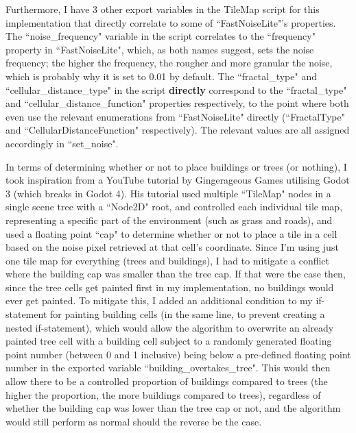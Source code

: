Furthermore, I have 3 other export variables in the TileMap script for this implementation that directly correlate to some of ``FastNoiseLite"'s properties. The ``noise\_frequency" variable in the script correlates to the ``frequency" property in ``FastNoiseLite", which, as both names suggest, sets the noise frequency; the higher the frequency, the rougher and more granular the noise\cite{fastnoiselitedocs}, which is probably why it is set to 0.01 by default.\cite{fastnoiselitedocs}  The ``fractal\_type" and ``cellular\_distance\_type" in the script \textbf{directly} correspond to the ``fractal\_type" and ``cellular\_distance\_function" properties respectively, to the point where both even use the relevant enumerations from ``FastNoiseLite" directly (``FractalType" and ``CellularDistanceFunction" respectively).\cite{fastnoiselitedocs} The relevant values are all assigned accordingly in ``set\_noise".

In terms of determining whether or not to place buildings or trees (or nothing), I took inspiration from a YouTube tutorial by Gingerageous Games utilising Godot 3\cite{gingergd3tutorialYT}\cite{gingergd3tutorialGH} (which breaks in Godot 4). His tutorial used multiple ``TileMap" nodes in a single scene tree with a ``Node2D" root, and controlled each individual tile map, representing a specific part of the environment (such as grass and roads), and used a floating point ``cap" to determine whether or not to place a tile in a cell based on the noise pixel retrieved at that cell's coordinate.\cite{gingergd3tutorialYT}\cite{gingergd3tutorialGH} Since I'm using just one tile map for everything (trees and buildings), I had to mitigate a conflict where the building cap was smaller than the tree cap. If that were the case then, since the tree cells get painted first in my implementation, no buildings would ever get painted. To mitigate this, I added an additional condition to my if-statement for painting building cells (in the same line, to prevent creating a nested if-statement), which would allow the algorithm to overwrite an already painted tree cell with a building cell subject to a randomly generated floating point number (between 0 and 1 inclusive) being below a pre-defined floating point number in the exported variable ``building\_overtakes\_tree". This would then allow there to be a controlled proportion of buildings compared to trees (the higher the proportion, the more buildings compared to trees), regardless of whether the building cap was lower than the tree cap or not, and the algorithm would still perform as normal should the reverse be the case.   

